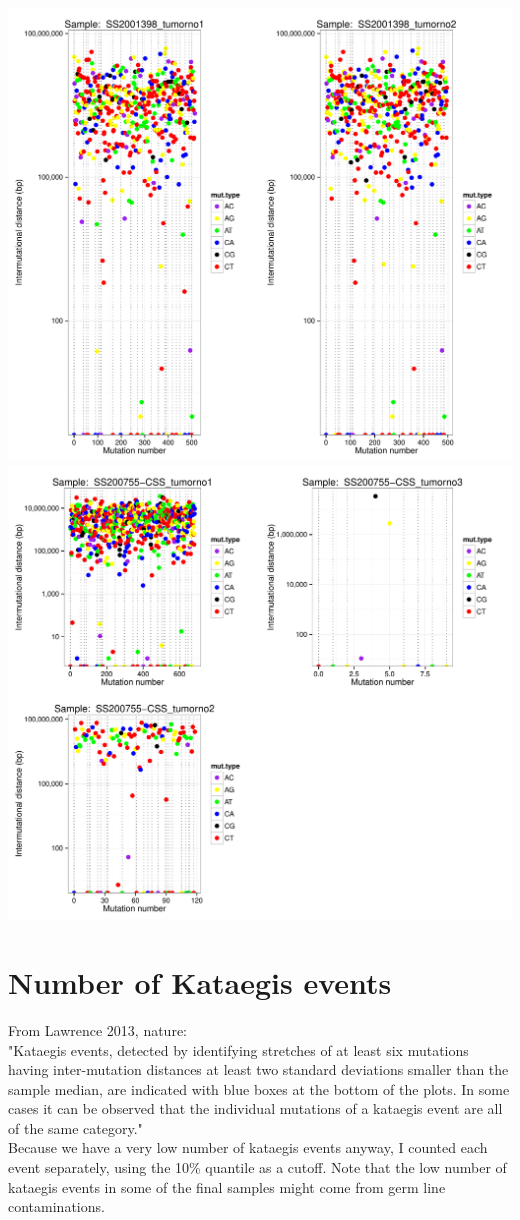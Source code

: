 \documentclass[a4paper,11pt]{article}
\begin{document}
\includegraphics{CLLpilot_rainfallplots_pub-010}
\\
\includegraphics{CLLpilot_rainfallplots_pub-011}
\section{Number of Kataegis events}
From Lawrence 2013, nature:\\
"Kataegis events, detected by identifying stretches of at least six mutations having inter-mutation distances at least two standard deviations smaller than the sample median, are indicated with blue boxes at the bottom of the plots. In some cases it can be observed that the individual mutations of a kataegis event are all of the same category."\\
Because we have a very low number of kataegis events anyway, I counted each event separately, using the 10\% quantile as a cutoff. Note that the low number of kataegis events in some of the final samples might come from germ line contaminations.
\end{document}
